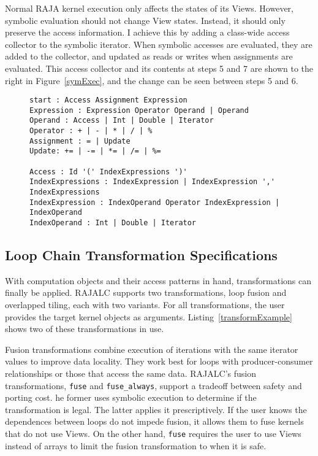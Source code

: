 Normal RAJA kernel execution only affects the states of its Views. 
However, symbolic evaluation should not change View states. 
Instead, it should only preserve the access information.
I achieve this by adding a class-wide access collector to the symbolic iterator. 
When symbolic accesses are evaluated, they are added to the collector, and updated as reads or writes when assignments are evaluated.
This access collector and its contents at steps 5 and 7 are shown to the right in Figure~\ref{symExec}, and the change can be seen between steps 5 and 6.


\begin{figure}[t]
\begin{lstlisting}[label={ExpressionGrammar},caption={EBNF Grammar to Support Symbolic Evaluation}]
start : Access Assignment Expression
Expression : Expression Operator Operand | Operand
Operand : Access | Int | Double | Iterator
Operator : + | - | * | / | %
Assignment : = | Update
Update: += | -= | *= | /= | %=

Access : Id '(' IndexExpressions ')'
IndexExpressions : IndexExpression | IndexExpression ',' IndexExpressions
IndexExpression : IndexOperand Operator IndexExpression | IndexOperand
IndexOperand : Int | Double | Iterator
\end{lstlisting}
\end{figure}
	
\subsection{Loop Chain Transformation Specifications}\label{sec:transspec}

With computation objects and their access patterns in hand, transformations can finally be applied.
RAJALC supports two transformations, loop fusion and overlapped tiling, each with two variants.
For all transformations, the user provides the target kernel
objects as arguments.
Listing~\ref{transformExample} shows two of these transformations in use.

Fusion transformations combine execution of iterations with the same iterator
values to improve data locality.
They work best for loops with producer-consumer relationships or those that
access the same data.
RAJALC's fusion transformations, \verb.fuse. and \verb.fuse_always., support
a tradeoff between safety and porting cost.
he former uses symbolic execution to determine if the transformation is legal.
The latter applies it prescriptively.
If the user knows the dependences between loops do not impede fusion,
it allows them to fuse kernels that do not use Views. 
On the other hand, \verb.fuse. requires the user to use Views instead
of arrays to limit the fusion transformation to when it is safe.

